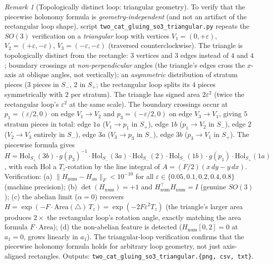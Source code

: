 \documentclass[11pt,a4paper]{article}
\theoremstyle{plain}
\theoremstyle{definition}
\theoremstyle{remark}
\newtheorem{remark}[theorem]{Remark}
\begin{document}
\begin{remark}[Topologically distinct loop: triangular geometry]
\label{rem:2cat-gluing-so3-triangular}
To verify that the piecewise holonomy formula is
\emph{geometry-independent} (and not an artifact of the rectangular loop
shape), script \texttt{two\_cat\_gluing\_so3\_triangular.py} repeats
the $SO(3)$ verification on a \emph{triangular} loop with vertices
$V_1 = (0, +\varepsilon)$, $V_2 = (+\varepsilon, -\varepsilon)$,
$V_3 = (-\varepsilon, -\varepsilon)$ (traversed counterclockwise). The
triangle is topologically distinct from the rectangle: $3$ vertices and
$3$ edges instead of $4$ and $4$; boundary crossings at
\emph{non-perpendicular} angles (the triangle's edges cross the $x$-axis at
oblique angles, not vertically); an \emph{asymmetric} distribution of stratum
pieces ($3$ pieces in $S_-$, $2$ in $S_+$; the rectangular loop splits
its $4$ pieces symmetrically with $2$ per stratum). The triangle has
signed area $2\varepsilon^2$ (twice the rectangular loop's $\varepsilon^2$
at the same scale). The boundary crossings occur at $p_1 = (\varepsilon/2,
0)$ on edge $V_1 \to V_2$ and $p_3 = (-\varepsilon/2, 0)$ on edge $V_3
\to V_1$, giving $5$ stratum pieces in total: edge $1a$ ($V_1 \to p_1$
in $S_+$), edge $1b$ ($p_1 \to V_2$ in $S_-$), edge $2$ ($V_2 \to V_3$
entirely in $S_-$), edge $3a$ ($V_3 \to p_3$ in $S_-$), edge $3b$ ($p_3
\to V_1$ in $S_+$). The piecewise formula gives $H = \mathrm{Hol}_{S_+}(3b)
\cdot g(p_3)^{-1} \cdot \mathrm{Hol}_{S_-}(3a) \cdot
\mathrm{Hol}_{S_-}(2) \cdot \mathrm{Hol}_{S_-}(1b) \cdot g(p_1) \cdot
\mathrm{Hol}_{S_+}(1a)$, with each $\mathrm{Hol}$ a $T_z$-rotation by the
line integral of $A = (F/2)(x\,dy - y\,dx)$. Verification: (a)
$\|H_{\mathrm{num}} - H_{\mathrm{an}}\|_F < 10^{-10}$ for all $\varepsilon
\in \{0.05, 0.1, 0.2, 0.4, 0.8\}$ (machine precision); (b)
$\det(H_{\mathrm{num}}) = +1$ and $H_{\mathrm{num}}^\top H_{\mathrm{num}}
= I$ (genuine $SO(3)$); (c) the abelian limit ($\alpha = 0$) recovers
$H = \exp(-F \cdot \mathrm{Area}(\triangle) \,T_z) = \exp(-2 F
\varepsilon^2 T_z)$ (the triangle's larger area produces $2\times$ the
rectangular loop's rotation angle, exactly matching the area formula
$F \cdot \mathrm{Area}$); (d) the non-abelian feature is detected
($H_{\mathrm{num}}[0,2] = 0$ at $a_1 = 0$, grows linearly in $a_1$).
The triangular-loop verification confirms that the piecewise holonomy
formula holds for arbitrary loop geometry, not just axis-aligned
rectangles. Outputs:
\texttt{two\_cat\_gluing\_so3\_triangular.\{png, csv, txt\}}.
\end{remark}
\end{document}
